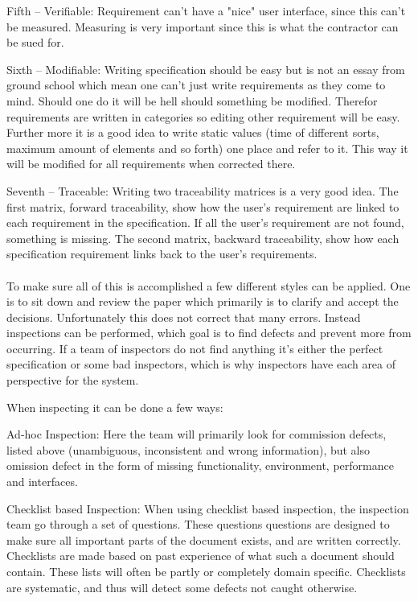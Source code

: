 \documentclass[Main]{subfiles}
\begin{document}
Fifth -- Verifiable:
Requirement can't have a "nice" user interface, since this can't be measured.
Measuring is very important since this is what the contractor can be sued for.

Sixth -- Modifiable:
Writing specification should be easy but is not an essay from ground school which mean one can't just write requirements as they come to mind.
Should one do it will be hell should something be modified.
Therefor requirements are written in categories so editing other requirement will be easy.
Further more it is a good idea to write static values (time of different sorts, maximum amount of elements and so forth) one place and refer to it.
This way it will be modified for all requirements when corrected there.

Seventh -- Traceable:
Writing two traceability matrices is a very good idea.
The first matrix, forward traceability, show how the user's requirement are linked to each requirement in the specification.
If all the user's requirement are not found, something is missing.
The second matrix, backward traceability, show how each specification requirement links back to the user's requirements.
\\
\\
To make sure all of this is accomplished a few different styles can be applied.
One is to sit down and review the paper which primarily is to clarify and accept the decisions.
Unfortunately this does not correct that many errors. 
Instead inspections can be performed, which goal is to find defects and prevent more from occurring.
If a team of inspectors do not find anything it's either the perfect specification or some bad inspectors, which is why inspectors have each area of perspective for the system. 

When inspecting it can be done a few ways:


Ad-hoc Inspection:
Here the team will primarily look for commission defects, listed above (unambiguous, inconsistent and wrong information), but also omission defect in the form of missing functionality, environment, performance and interfaces.


Checklist based Inspection:
When using checklist based inspection, the inspection team go through a set of questions. These questions questions are designed to make sure all important parts of the document exists, and are written correctly. Checklists are made based on past experience of what such a document should contain. These lists will often be partly or completely domain specific. Checklists are systematic, and thus will detect some defects not caught otherwise.
\end{document}
